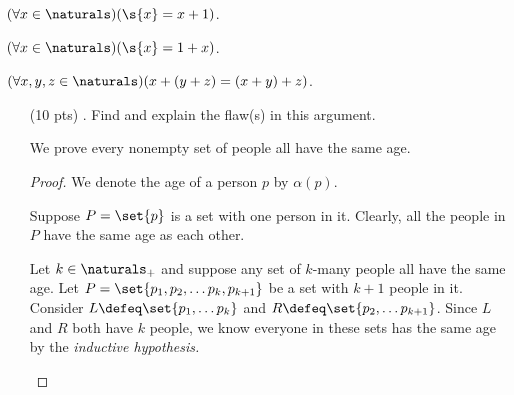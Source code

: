 {  $(\forall x \in \naturals)(\s{x} = x + 1)$.

  $(\forall x \in \naturals)(\s{x} = 1 + x)$.

  $(\forall x, y, z \in \naturals)(x + (y + z) = (x + y) + z)$.
}

\begin{enumerate}

  \item[(10 pts) \quad 1.]
    Find and explain the flaw(s) in this argument.
    \begin{mdframed}
      We prove every nonempty set of people all have the same age.
      \begin{proof}
        We denote the age of a person $p$ by $\alpha(p)$.

        \begin{case}
          Suppose $P = \set{p}$ is a set with one person in it.
          Clearly, all the people in $P$ have the same age as each other.
        \end{case}
        \begin{case}
          Let $k \in \naturals_+$ and suppose any set of $k$-many people all have the same age.
          Let $P = \set{p_1, p_2, \dots p_k, p_{k + 1}}$ be a set with $k + 1$ people in it.
          Consider $L \defeq \set{p_1, \dots p_k}$ and $R \defeq \set{p_2, \dots p_{k + 1}}$.
          Since $L$ and $R$ both have $k$ people, we know everyone in these sets has the same age by the \emph{inductive hypothesis.}


\end{case}
\end{proof}
\end{mdframed}
\end{enumerate}
